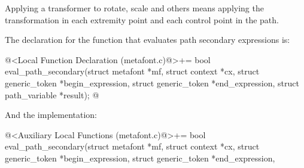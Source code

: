 Applying a transformer to rotate, scale and others means applying the
transformation in each extremity point and each control point in the
path.

The declaration for the function that evaluates path secondary
expressions is:

\iniciocodigo
@<Local Function Declaration (metafont.c)@>+=
bool eval_path_secondary(struct metafont *mf, struct context *cx,
                        struct generic_token *begin_expression,
                        struct generic_token *end_expression,
                        struct path_variable *result);
@
\fimcodigo

And the implementation:

\iniciocodigo
@<Auxiliary Local Functions (metafont.c)@>+=
bool eval_path_secondary(struct metafont *mf, struct context *cx,
                        struct generic_token *begin_expression,
                        struct generic_token *end_expression,
